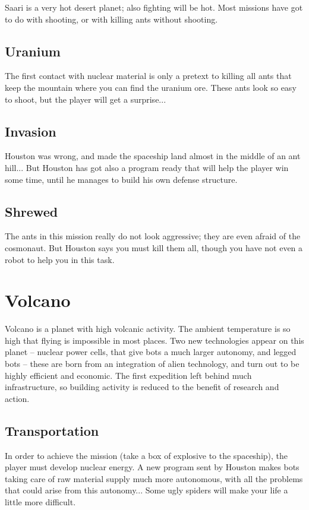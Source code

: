Saari is a very hot desert planet; also fighting will be hot. Most missions have got to do with shooting, or with killing ants without shooting.


\subsection{Uranium}

The first contact with nuclear material is only a pretext to killing all ants that keep the mountain where you can find the uranium ore. These ants look so easy to shoot, but the player will get a surprise...


\subsection{Invasion}

Houston was wrong, and made the spaceship land almost in the middle of an ant hill... But Houston has got also a program ready that will help the player win some time, until he manages to build his own defense structure.


\subsection{Shrewed}

The ants in this mission really do not look aggressive; they are even afraid of the cosmonaut. But Houston says you must kill them all, though you have not even a robot to help you in this task.


\newpage
\section{Volcano}

Volcano is a planet with high volcanic activity. The ambient temperature is so high that flying is impossible in most places. Two new technologies appear on this planet -- nuclear power cells, that give bots a much larger autonomy, and legged bots -- these are born from an integration of alien technology, and turn out to be highly efficient and economic. The first expedition left behind much infrastructure, so building activity is reduced to the benefit of research
and action.


\subsection{Transportation}

In order to achieve the mission (take a box of explosive to the spaceship), the player must develop nuclear energy. A new program sent by Houston makes bots taking care of raw material supply much more autonomous, with all the problems that could arise from this autonomy... Some ugly spiders will make your life a little more difficult.


